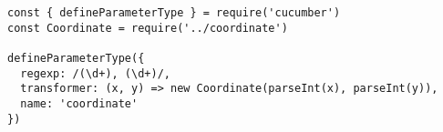 \begin{verbatim}
const { defineParameterType } = require('cucumber')
const Coordinate = require('../coordinate')

defineParameterType({
  regexp: /(\d+), (\d+)/,
  transformer: (x, y) => new Coordinate(parseInt(x), parseInt(y)),
  name: 'coordinate'
})
\end{verbatim}